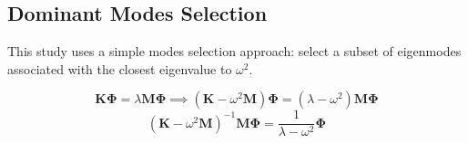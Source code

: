 \subsection{Dominant Modes Selection}
\label{ssec: mode selection}

This study uses a simple modes selection approach: select a subset of eigenmodes associated with the closest eigenvalue to $\omega^{2}$.

\begin{equation}
    \mathbf{K}\mathbf{\Phi}
    =
    \lambda\mathbf{M}\mathbf{\Phi}
    \implies
    \left(
        \mathbf{K} - \omega^{2} \mathbf{M}
    \right)
    \mathbf{\Phi}
    =
    \left(
        \lambda - \omega^{2}
    \right)
    \mathbf{M}
    \mathbf{\Phi}
\end{equation}
\begin{equation}
    \left(
        \mathbf{K} - \omega^{2} \mathbf{M}
    \right)^{-1}
    \mathbf{M}
    \mathbf{\Phi}
    =
    \frac{1}{
        \lambda - \omega^{2}
    }
    \mathbf{\Phi}
\end{equation}